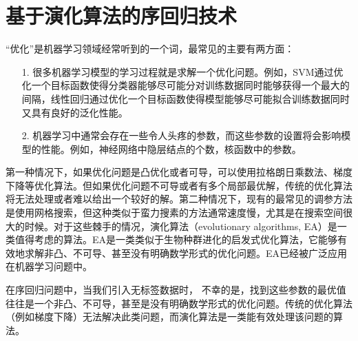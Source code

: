 \section{基于演化算法的序回归技术}
“优化”是机器学习领域经常听到的一个词，最常见的主要有两方面：
\begin{enumerate}
\item[1.]很多机器学习模型的学习过程就是求解一个优化问题。例如，SVM通过优化一个目标函数使得分类器能够尽可能分对训练数据同时能够获得一个最大的间隔，线性回归通过优化一个目标函数使得模型能够尽可能拟合训练数据同时又具有良好的泛化性能。
\item[2.]机器学习中通常会存在一些令人头疼的参数，而这些参数的设置将会影响模型的性能。例如，神经网络中隐层结点的个数，核函数中的参数。
\end{enumerate}
第一种情况下，如果优化问题是凸优化或者可导，可以使用拉格朗日乘数法、梯度下降等优化算法。但如果优化问题不可导或者有多个局部最优解，传统的优化算法将无法处理或者难以给出一个较好的解。第二种情况下，现有的最常见的调参方法是使用网格搜索，但这种类似于蛮力搜素的方法通常速度慢，尤其是在搜索空间很大的时候。对于这些棘手的情况，演化算法（evolutionary algorithms, EA）\citep{back1996evolutionary}是一类值得考虑的算法。EA是一类类似于生物种群进化的启发式优化算法，它能够有效地求解非凸、不可导、甚至没有明确数学形式的优化问题。EA已经被广泛应用在机器学习问题中\citep{liu2000evolutionary}\citep{tang2005linear}\citep{liu2000ensemble}。

在序回归问题中，当我们引入无标签数据时，
不幸的是，找到这些参数的最优值往往是一个非凸、不可导，甚至是没有明确数学形式的优化问题。传统的优化算法（例如梯度下降）无法解决此类问题，而演化算法是一类能有效处理该问题的算法。

